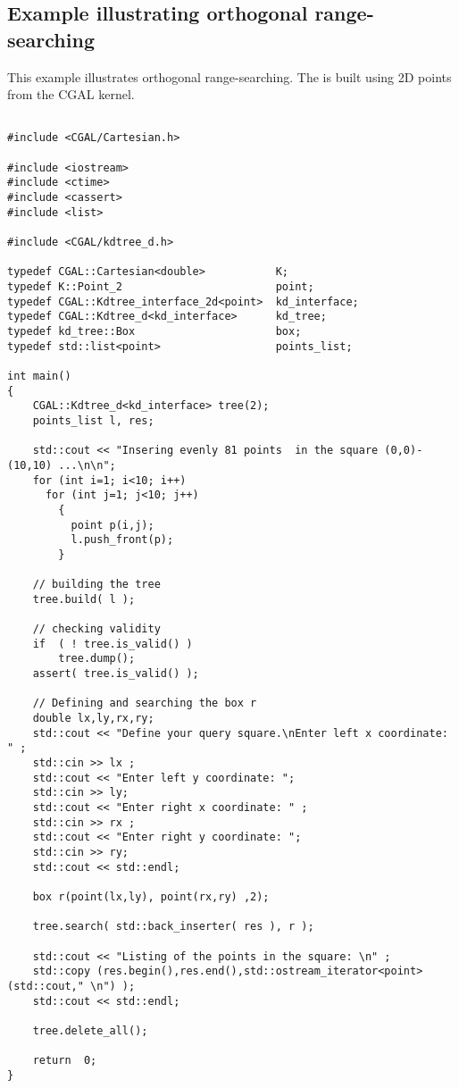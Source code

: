 \subsection{Example illustrating orthogonal range-searching}

\ccExample

This example illustrates orthogonal range-searching. 
The {\kdt} is built using 2D points from the CGAL kernel. 

\begin{verbatim}

#include <CGAL/Cartesian.h>

#include <iostream>
#include <ctime>
#include <cassert>
#include <list>

#include <CGAL/kdtree_d.h>

typedef CGAL::Cartesian<double>           K;
typedef K::Point_2                        point;
typedef CGAL::Kdtree_interface_2d<point>  kd_interface;
typedef CGAL::Kdtree_d<kd_interface>      kd_tree;
typedef kd_tree::Box                      box;
typedef std::list<point>                  points_list;

int main()
{
    CGAL::Kdtree_d<kd_interface> tree(2);
    points_list l, res;

    std::cout << "Insering evenly 81 points  in the square (0,0)-(10,10) ...\n\n";
    for (int i=1; i<10; i++)
      for (int j=1; j<10; j++)
        {
          point p(i,j);
          l.push_front(p);
        }

    // building the tree 
    tree.build( l );
       
    // checking validity
    if  ( ! tree.is_valid() )
        tree.dump();
    assert( tree.is_valid() );

    // Defining and searching the box r
    double lx,ly,rx,ry;
    std::cout << "Define your query square.\nEnter left x coordinate: " ;
    std::cin >> lx ;
    std::cout << "Enter left y coordinate: ";
    std::cin >> ly;
    std::cout << "Enter right x coordinate: " ;
    std::cin >> rx ;
    std::cout << "Enter right y coordinate: ";
    std::cin >> ry;
    std::cout << std::endl; 

    box r(point(lx,ly), point(rx,ry) ,2);

    tree.search( std::back_inserter( res ), r );
    
    std::cout << "Listing of the points in the square: \n" ;
    std::copy (res.begin(),res.end(),std::ostream_iterator<point>(std::cout," \n") );
    std::cout << std::endl;

    tree.delete_all();

    return  0;
}

\end{verbatim}


